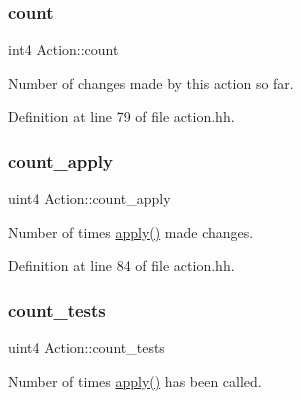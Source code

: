 \mbox{\label{class_action_aa544c614285cb70093a3cb623708679c}} 
\subsubsection{\texorpdfstring{count}{count}}
{\footnotesize\ttfamily int4 Action\+::count\hspace{0.3cm}{\ttfamily [protected]}}



Number of changes made by this action so far. 



Definition at line 79 of file action.\+hh.

\mbox{\label{class_action_ad732a3042b7d99ecba8bec5459ed0f32}} 
\subsubsection{\texorpdfstring{count\_apply}{count\_apply}}
{\footnotesize\ttfamily uint4 Action\+::count\+\_\+apply\hspace{0.3cm}{\ttfamily [protected]}}



Number of times \mbox{\hyperlink{class_action_aac1c3999d6c685b15f5d9765a4d04173}{apply()}} made changes. 



Definition at line 84 of file action.\+hh.

\mbox{\label{class_action_adac1cdac8ebad4c833c74cfb33b5eecc}} 
\subsubsection{\texorpdfstring{count\_tests}{count\_tests}}
{\footnotesize\ttfamily uint4 Action\+::count\+\_\+tests\hspace{0.3cm}{\ttfamily [protected]}}



Number of times \mbox{\hyperlink{class_action_aac1c3999d6c685b15f5d9765a4d04173}{apply()}} has been called. 



